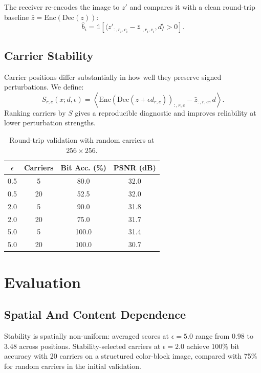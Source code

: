 \documentclass{article}
\begin{document}
The receiver re-encodes the image to $z'$ and compares it with a clean round-trip baseline $\bar z=\mathrm{Enc}(\mathrm{Dec}(z))$:
\begin{equation}
\hat b_i=\mathbb{1}\left[\langle z'_{:,r_i,c_i}-\bar z_{:,r_i,c_i},d\rangle>0\right].
\end{equation}

\subsection{Carrier Stability}

Carrier positions differ substantially in how well they preserve signed perturbations. We define:
\begin{equation}
S_{r,c}(x;d,\epsilon)=
\left\langle
\mathrm{Enc}(\mathrm{Dec}(z+\epsilon d_{r,c}))_{:,r,c}-\bar z_{:,r,c},d
\right\rangle .
\end{equation}
Ranking carriers by $S$ gives a reproducible diagnostic and improves reliability at lower perturbation strengths.

\begin{table}[t]
\caption{Round-trip validation with random carriers at $256\times256$.}
\label{tab:roundtrip}
\centering
\begin{small}
\begin{tabular}{cccc}
\toprule
$\epsilon$ & Carriers & Bit Acc. (\%) & PSNR (dB) \\
\midrule
0.5 & 5  & 80.0  & 32.0 \\
0.5 & 20 & 52.5  & 32.0 \\
2.0 & 5  & 90.0  & 31.8 \\
2.0 & 20 & 75.0  & 31.7 \\
5.0 & 5  & 100.0 & 31.4 \\
5.0 & 20 & 100.0 & 30.7 \\
\bottomrule
\end{tabular}
\end{small}
\end{table}

\section{Evaluation}

\subsection{Spatial And Content Dependence}

Stability is spatially non-uniform: averaged scores at $\epsilon=5.0$ range from 0.98 to 3.48 across positions. Stability-selected carriers at $\epsilon=2.0$ achieve 100\% bit accuracy with 20 carriers on a structured color-block image, compared with 75\% for random carriers in the initial validation.
\end{document}

